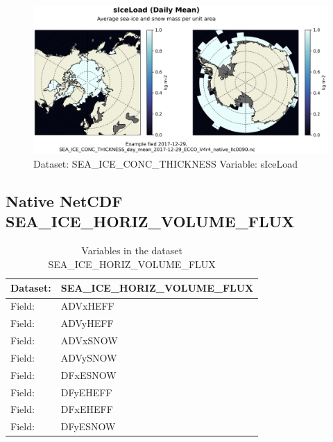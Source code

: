 \begin{figure}[H]
\centering
\includegraphics[scale=0.55]{../images/plots/native_plots/Sea-Ice_and_Snow_Concentration_and_Thickness/sIceLoad.png}
\caption{Dataset: SEA\_ICE\_CONC\_THICKNESS Variable: sIceLoad}
\label{tab:table-SEA_ICE_CONC_THICKNESS_sIceLoad-Plot}
\end{figure}
\pagebreak
\subsection{Native NetCDF SEA\_ICE\_HORIZ\_VOLUME\_FLUX}
\newp
\begin{longtable}{|p{}|p{}|}
\caption{Variables in the dataset SEA\_ICE\_HORIZ\_VOLUME\_FLUX}
\label{tab:table-SEA_ICE_HORIZ_VOLUME_FLUX-fields} \\ 
\hline \endhead \hline \endfoot
\rowcolor{lightgray} \textbf{Dataset:} & \textbf{SEA\_ICE\_HORIZ\_VOLUME\_FLUX} \\ \hline
Field: &ADVxHEFF \\ \hline
Field: &ADVyHEFF \\ \hline
Field: &ADVxSNOW \\ \hline
Field: &ADVySNOW \\ \hline
Field: &DFxESNOW \\ \hline
Field: &DFyEHEFF \\ \hline
Field: &DFxEHEFF \\ \hline
Field: &DFyESNOW \\ \hline
\end{longtable}

\pagebreak
